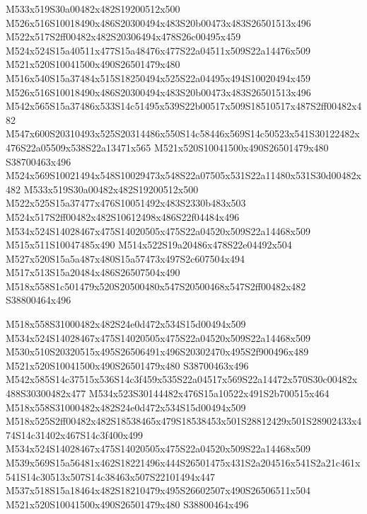 \documentclass{article}
\begin{document}
\begin{multicols}{2}
M533x519S30a00482x482S19200512x500 M526x516S10018490x486S20300494x483S20b00473x483S26501513x496 M522x517S2ff00482x482S20306494x478S26c00495x459 M524x524S15a40511x477S15a48476x477S22a04511x509S22a14476x509 M521x520S10041500x490S26501479x480 M516x540S15a37484x515S18250494x525S22a04495x494S10020494x459 M526x516S10018490x486S20300494x483S20b00473x483S26501513x496 M542x565S15a37486x533S14c51495x539S22b00517x509S18510517x487S2ff00482x482 M547x600S20310493x525S20314486x550S14c58446x569S14c50523x541S30122482x476S22a05509x538S22a13471x565 M521x520S10041500x490S26501479x480 S38700463x496 M524x569S10021494x548S10029473x548S22a07505x531S22a11480x531S30d00482x482 M533x519S30a00482x482S19200512x500 M522x525S15a37477x476S10051492x483S2330b483x503 M524x517S2ff00482x482S10612498x486S22f04484x496 M534x524S14028467x475S14020505x475S22a04520x509S22a14468x509 M515x511S10047485x490 M514x522S19a20486x478S22e04492x504 M527x520S15a5a487x480S15a57473x497S2c607504x494 M517x513S15a20484x486S26507504x490 M518x558S1c501479x520S20500480x547S20500468x547S2ff00482x482 S38800464x496

M518x558S31000482x482S24e0d472x534S15d00494x509 M534x524S14028467x475S14020505x475S22a04520x509S22a14468x509 M530x510S20320515x495S26506491x496S20302470x495S2f900496x489 M521x520S10041500x490S26501479x480 S38700463x496 M542x585S14c37515x536S14c3f459x535S22a04517x569S22a14472x570S30c00482x488S30300482x477 M534x523S30144482x476S15a10522x491S2b700515x464 M518x558S31000482x482S24e0d472x534S15d00494x509 M518x525S2ff00482x482S18538465x479S18538453x501S28812429x501S28902433x474S14c31402x467S14c3f400x499 M534x524S14028467x475S14020505x475S22a04520x509S22a14468x509 M539x569S15a56481x462S18221496x444S26501475x431S2a204516x541S2a21c461x541S14c30513x507S14c38463x507S22101494x447 M537x518S15a18464x482S18210479x495S26602507x490S26506511x504 M521x520S10041500x490S26501479x480 S38800464x496


\end{multicols}
\end{document}
